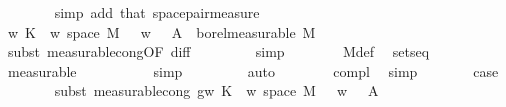 \begin{isabellebody}
\ \ \ \ \ \ \isamarkupfalse%
\ {\isacharparenleft}{\kern0pt}simp\ add{\isacharcolon}{\kern0pt}\ that\ space{\isacharunderscore}{\kern0pt}pair{\isacharunderscore}{\kern0pt}measure{\isacharparenright}{\kern0pt}\isanewline
\ \ \ \ \isamarkupfalse%
\ {\isachardoublequoteopen}{\isacharparenleft}{\kern0pt}{\isasymlambda}w{\isachardot}{\kern0pt}\ K\ {\isacharparenleft}{\kern0pt}{\isasymomega}\ w{\isacharparenright}{\kern0pt}\ {\isacharparenleft}{\kern0pt}space\ M{}\ {\isacharminus}{\kern0pt}\ {\isacharbraceleft}{\kern0pt}{\isasymomega}\ {\isacharparenleft}{\kern0pt}w{\isacharcomma}{\kern0pt}\ {\isasymomega}\ {\isasymin}\ A{\isacharbraceright}{\kern0pt}{\isacharparenright}{\kern0pt}{\isacharparenright}{\kern0pt}\ {\isasymin}\ borel{\isacharunderscore}{\kern0pt}measurable\ M{}{\isachardoublequoteclose}\isanewline
\ \ \ \ \ \ \isamarkupfalse%
\ {\isacharparenleft}{\kern0pt}subst\ measurable{\isacharunderscore}{\kern0pt}cong{\isacharbrackleft}{\kern0pt}OF\ diff{\isacharbrackright}{\kern0pt}{\isacharparenright}{\kern0pt}\isanewline
\ \ \ \ \ \ \ \isamarkupfalse%
\ simp\isanewline
\ \ \ \ \ \ \isamarkupfalse%
\ M{}{\isacharunderscore}{\kern0pt}def\ \isamarkupfalse%
\ sets{\isacharunderscore}{\kern0pt}eq\ \isamarkupfalse%
\ measurable\isanewline
\ \ \ \ \ \ \isamarkupfalse%
\ {\isasymomega}\ \isamarkupfalse%
\ simp\isanewline
\ \ \ \ \ \ \ \isamarkupfalse%
\ auto\isanewline
\ \ \ \ \ \ \isamarkupfalse%
\ compl\ \isamarkupfalse%
\ simp\isanewline
\ \ \ \ \isamarkupfalse%
\ \isamarkupfalse%
\ {\isacharquery}{\kern0pt}case\isanewline
\ \ \ \ \ \ \isamarkupfalse%
\ {\isacharparenleft}{\kern0pt}subst\ measurable{\isacharunderscore}{\kern0pt}cong{\isacharbrackleft}{\kern0pt}\ g{\isacharequal}{\kern0pt}{\isachardoublequoteopen}{\isacharparenleft}{\kern0pt}{\isasymlambda}w{\isachardot}{\kern0pt}\ K\ {\isacharparenleft}{\kern0pt}{\isasymomega}\ w{\isacharparenright}{\kern0pt}\ {\isacharparenleft}{\kern0pt}space\ M{}\ {\isacharminus}{\kern0pt}\ {\isacharbraceleft}{\kern0pt}{\isasymomega}\ {\isacharparenleft}{\kern0pt}w{\isacharcomma}{\kern0pt}\ {\isasymomega}\ {\isasymin}\ A{\isacharbraceright}{\kern0pt}{\isacharparenright}{\kern0pt}{\isacharparenright}{\kern0pt}{\isachardoublequoteclose}{\isacharbrackright}{\kern0pt}{\isacharparenright}{\kern0pt}\isanewline

\end{isabellebody}
